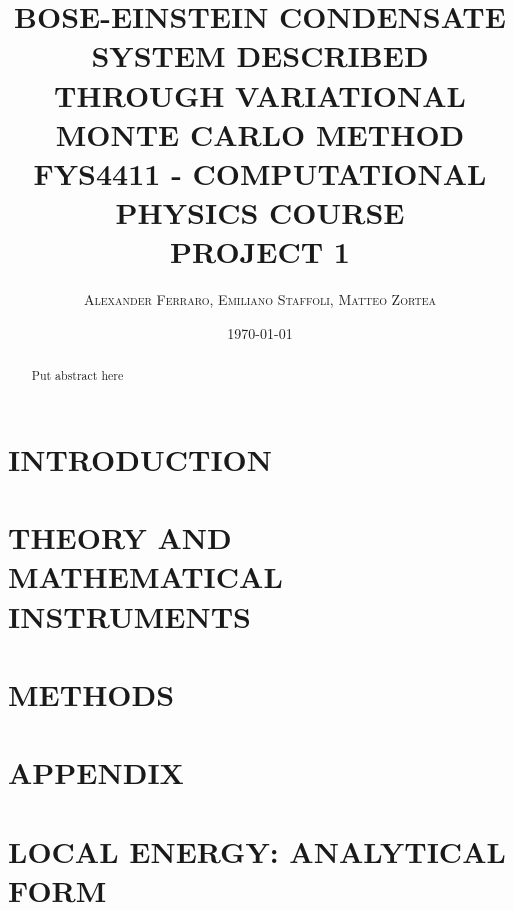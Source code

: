 \documentclass[a4paper]{article}
\title{\Large BOSE-EINSTEIN CONDENSATE SYSTEM DESCRIBED THROUGH VARIATIONAL MONTE CARLO METHOD \\ \vspace{5mm}  \large FYS4411 - COMPUTATIONAL PHYSICS COURSE \\ \large PROJECT 1 }
\author{\textsc{Alexander Ferraro, Emiliano Staffoli, Matteo Zortea}}
\date{\today}
\begin{document}
\setcounter{page}{1}

\maketitle

\begin{abstract}
    Put abstract here
\end{abstract}

\begin{multicols*}{2}
 \noindent

\section{INTRODUCTION}
   
   
\section{THEORY AND MATHEMATICAL INSTRUMENTS}
    
   
\section{METHODS}
    

\newpage
\section*{APPENDIX}
\appendix
\section{LOCAL ENERGY: ANALYTICAL FORM}
\label{appendix:local_energy}





\end{multicols*}

\newpage
\printbibliography
\end{document}

